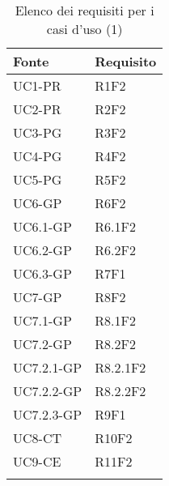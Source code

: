 

		\begin{table}[H]
			\centering
			{\def\arraystretch{1.5}
			\begin{tabularx}{0.7\textwidth}{YY}
				\textbf{Fonte} & \textbf{Requisito} \\
				\toprule
				UC1-PR & R1F2 \\
				UC2-PR & R2F2 \\
				UC3-PG & R3F2 \\
				UC4-PG & R4F2 \\
				UC5-PG & R5F2 \\
				UC6-GP & R6F2 \\
				UC6.1-GP & R6.1F2 \\
				UC6.2-GP & R6.2F2 \\
				UC6.3-GP & R7F1 \\
				UC7-GP & R8F2 \\
				UC7.1-GP & R8.1F2 \\
				UC7.2-GP & R8.2F2 \\
				UC7.2.1-GP & R8.2.1F2 \\
				UC7.2.2-GP & R8.2.2F2 \\
				UC7.2.3-GP & R9F1 \\
				UC8-CT & R10F2 \\
				UC9-CE & R11F2 \\
				\bottomrule \\
			\end{tabularx}}
			\caption{Elenco dei requisiti per i casi d'uso (1)}
		\end{table}


